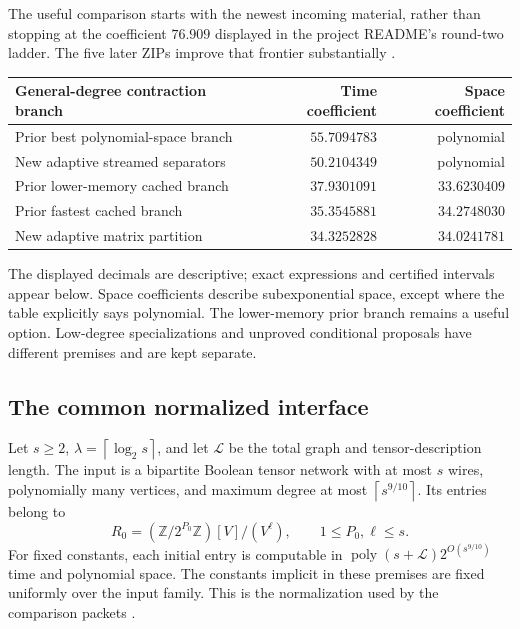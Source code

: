 \documentclass[11pt,letterpaper]{article}
\theoremstyle{remark}\newtheorem{remark}[theorem]{Remark}
\newcommand{\poly}{\operatorname{poly}}
\newcommand{\ceil}[1]{\left\lceil #1\right\rceil}
\begin{document}
The useful comparison starts with the newest incoming material, rather than
stopping at the coefficient $76.909$ displayed in the project README's
round-two ladder. The five later ZIPs improve that frontier substantially
\cite{index,adaptive,tree,frontier}.

\begin{center}
\begin{tabular}{@{}p{}rr@{}}
\toprule
General-degree contraction branch & Time coefficient & Space coefficient\\
\midrule
Prior best polynomial-space branch & $55.7094783$ & polynomial\\
New adaptive streamed separators & $50.2104349$ & polynomial\\[3pt]
Prior lower-memory cached branch & $37.9301091$ & $33.6230409$\\
Prior fastest cached branch & $35.3545881$ & $34.2748030$\\
New adaptive matrix partition & $34.3252828$ & $34.0241781$\\
\bottomrule
\end{tabular}
\end{center}
The displayed decimals are descriptive; exact expressions and certified
intervals appear below. Space coefficients describe subexponential space,
except where the table explicitly says polynomial. The lower-memory prior
branch remains a useful option. Low-degree specializations and unproved
conditional proposals have different premises and are kept separate.

\subsection{The common normalized interface}

Let $s\ge2$, $\lambda=\ceil{\log_2s}$, and let $\mathcal L$ be the total
graph and tensor-description length. The input is a bipartite Boolean
tensor network with at most $s$ wires, polynomially many vertices, and
maximum degree at most $\ceil{s^{9/10}}$. Its entries belong to
\[
 R_0=(\mathbb Z/2^{P_0}\mathbb Z)[V]/(V^\ell),\qquad
 1\le P_0,\ell\le s.
\]
For fixed constants, each initial entry is computable in
$\poly(s+\mathcal L)2^{O(s^{9/10})}$ time and polynomial space.
The constants implicit in these premises are fixed uniformly over the
input family. This is the normalization used by the comparison packets
\cite{contraction,tree}.
\end{document}
